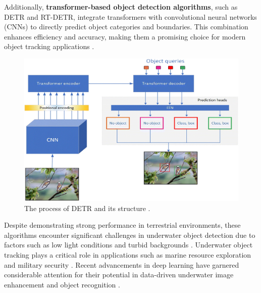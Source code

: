 Additionally, \textbf{transformer-based object detection algorithms}, such as DETR and RT-DETR, integrate transformers with convolutional neural networks (CNNs) to directly predict object categories and boundaries. This combination enhances efficiency and accuracy, making them a promising choice for modern object tracking applications \cite{zhou2024real}.
\begin{figure}[h]
    \centering
    \includegraphics[width=1\linewidth]{images/The process of DETR and its structure.png}
    \caption{The process of DETR and its structure \cite{arkin2023survey}.}
\end{figure}

Despite demonstrating strong performance in terrestrial environments, these algorithms encounter significant challenges in underwater object detection due to factors such as low light conditions and turbid backgrounds \cite{qiu2024boundary}\cite{zhou2024real}\cite{mathias2022occlusion}. Underwater object tracking plays a critical role in applications such as marine resource exploration and military security \cite{qiu2024boundary}. Recent advancements in deep learning have garnered considerable attention for their potential in data-driven underwater image enhancement and object recognition \cite{yang2024lu2net}.

